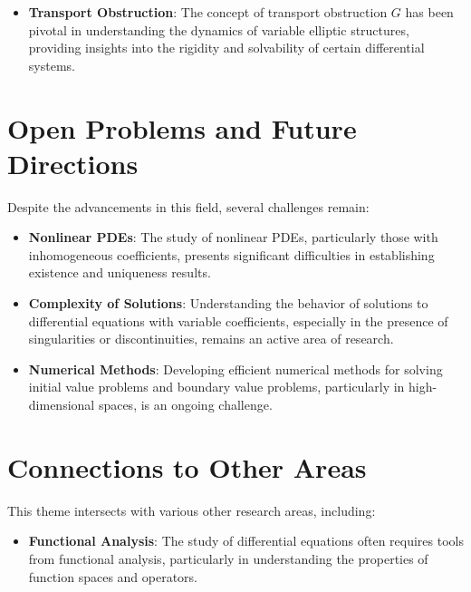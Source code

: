 \documentclass[11pt,a4paper]{article}
\begin{document}
\begin{itemize}
\item \textbf{Transport Obstruction}: The concept of transport obstruction \( G \) has been pivotal in understanding the dynamics of variable elliptic structures, providing insights into the rigidity and solvability of certain differential systems.
\end{itemize}

\section{Open Problems and Future Directions}

Despite the advancements in this field, several challenges remain:

\begin{itemize}
\item \textbf{Nonlinear PDEs}: The study of nonlinear PDEs, particularly those with inhomogeneous coefficients, presents significant difficulties in establishing existence and uniqueness results.
\end{itemize}

\begin{itemize}
\item \textbf{Complexity of Solutions}: Understanding the behavior of solutions to differential equations with variable coefficients, especially in the presence of singularities or discontinuities, remains an active area of research.
\end{itemize}

\begin{itemize}
\item \textbf{Numerical Methods}: Developing efficient numerical methods for solving initial value problems and boundary value problems, particularly in high-dimensional spaces, is an ongoing challenge.
\end{itemize}

\section{Connections to Other Areas}

This theme intersects with various other research areas, including:

\begin{itemize}
\item \textbf{Functional Analysis}: The study of differential equations often requires tools from functional analysis, particularly in understanding the properties of function spaces and operators.
\end{itemize}
\end{document}
